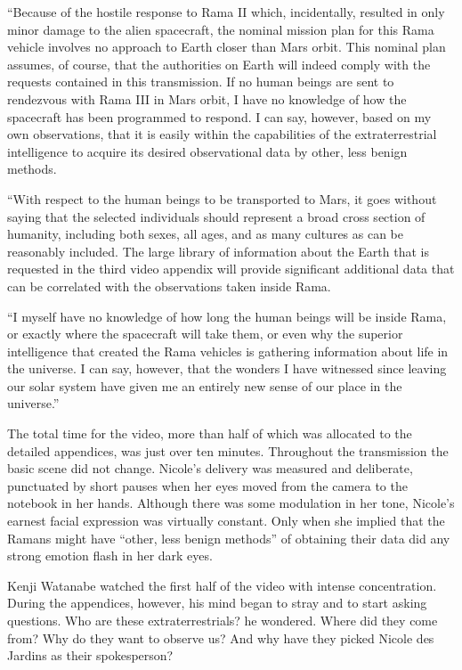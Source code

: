 \documentclass[]{article}
\begin{document}
{“Because of the hostile response to Rama II which, incidentally, resulted in only minor damage to the alien spacecraft, the nominal mission plan for this Rama vehicle involves no approach to Earth closer than Mars orbit.  This nominal plan assumes, of course, that the authorities on Earth will indeed comply with the requests contained in this transmission.  If no human beings are sent to rendezvous with Rama III in Mars orbit, I have no knowledge of how the spacecraft has been programmed to respond.  I can say, however, based on my own observations, that it is easily within the capabilities of the extraterrestrial intelligence to acquire its desired observational data by other, less benign methods.

“With respect to the human beings to be transported to Mars, it goes without saying that the selected individuals should represent a broad cross section of humanity, including both sexes, all ages, and as many cultures as can be reasonably included.  The large library of information about the Earth that is requested in the third video appendix will provide significant additional data that can be correlated with the observations taken inside Rama.

“I myself have no knowledge of how long the human beings will be inside Rama, or exactly where the spacecraft will take them, or even why the superior intelligence that created the Rama vehicles is gathering information about life in the universe.  I can say, however, that the wonders I have witnessed since leaving our solar system have given me an entirely new sense of our place in the universe.”

The total time for the video, more than half of which was allocated to the detailed appendices, was just over ten minutes.  Throughout the transmission the basic scene did not change.  Nicole’s delivery was measured and deliberate, punctuated by short pauses when her eyes moved from the camera to the notebook in her hands.  Although there was some modulation in her tone, Nicole’s earnest facial expression was virtually constant.  Only when she implied that the Ramans might have “other, less benign methods” of obtaining their data did any strong emotion flash in her dark eyes.

Kenji Watanabe watched the first half of the video with intense concentration.  During the appendices, however, his mind began to stray and to start asking questions.  Who are these extraterrestrials? he wondered.  Where did they come from? Why do they want to observe us? And why have they picked Nicole des Jardins as their spokesperson?

}
\end{document}
